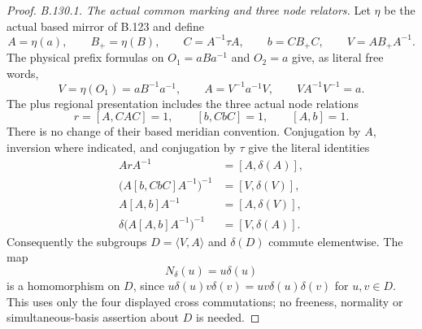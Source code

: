 \begin{proof}
\emph{B.130.1. The actual common marking and three node relators.}
Let $\eta$ be the actual based mirror of B.123 and define
\begin{equation}\label{eq:B130-local}
 A=\eta(a),\qquad B_+=\eta(B),\qquad
 C=A^{-1}\tau A,\qquad b=CB_+C,\qquad V=AB_+A^{-1}.
\end{equation}
The physical prefix formulas on $O_1=aBa^{-1}$ and $O_2=a$
give, as literal free words,
\begin{equation}\label{eq:B130-mirror-identities}
 V=\eta(O_1)=aB^{-1}a^{-1},\qquad
 A=V^{-1}a^{-1}V,\qquad VA^{-1}V^{-1}=a.
\end{equation}
The plus regional presentation includes the three actual node
relations
\begin{equation}\label{eq:B130-three-nodes}
 r=[A,CAC]=1,\qquad [b,CbC]=1,\qquad [A,b]=1.
\end{equation}
There is no change of their based meridian convention. Conjugation
by $A$, inversion where indicated, and conjugation by $\tau$
give the literal identities
\begin{equation}\label{eq:B130-four-crosses}
\begin{aligned}
 ArA^{-1}&=[A,\delta(A)],\\
 \bigl(A[b,CbC]A^{-1}\bigr)^{-1}&=[V,\delta(V)],\\
 A[A,b]A^{-1}&=[A,\delta(V)],\\
 \delta\bigl(A[A,b]A^{-1}\bigr)^{-1}&=[V,\delta(A)].
\end{aligned}
\end{equation}
Consequently the subgroups $D=\langle V,A\rangle$ and
$\delta(D)$ commute elementwise. The map
\[
 N_\delta(u)=u\delta(u)
\]
is a homomorphism on $D$, since
$u\delta(u)v\delta(v)=uv\delta(u)\delta(v)$ for $u,v\in D$.
This uses only the four displayed cross commutations; no
freeness, normality or simultaneous-basis assertion about $D$
is needed.


\end{proof}
